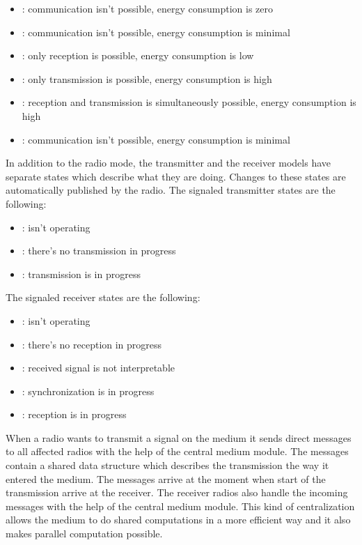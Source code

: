 \begin{itemize}
  \item {}: communication isn't possible, energy consumption is zero
  \item {}: communication isn't possible, energy consumption is minimal
  \item {}: only reception is possible, energy consumption is low
  \item {}: only transmission is possible, energy consumption is
high
  \item {}: reception and transmission is simultaneously
possible, energy consumption is high
  \item {}: communication isn't possible, energy consumption is
minimal
\end{itemize}

In addition to the radio mode, the transmitter and the receiver models have
separate states which describe what they are doing. Changes to these states are
automatically published by the radio. The signaled transmitter states are the
following:

\begin{itemize}
  \item {}: isn't operating
  \item {}: there's no transmission in progress
  \item {}: transmission is in progress
\end{itemize}

The signaled receiver states are the following:

\begin{itemize}
  \item {}: isn't operating
  \item {}: there's no reception in progress
  \item {}: received signal is not interpretable
  \item {}: synchronization is in progress
  \item {}: reception is in progress
\end{itemize}

When a radio wants to transmit a signal on the medium it sends direct messages
to all affected radios with the help of the central medium module. The messages
contain a shared data structure which describes the transmission the way it
entered the medium. The messages arrive at the moment when start of the
transmission arrive at the receiver. The receiver radios also handle the
incoming messages with the help of the central medium module. This kind of
centralization allows the medium to do shared computations in a more efficient
way and it also makes parallel computation possible.

